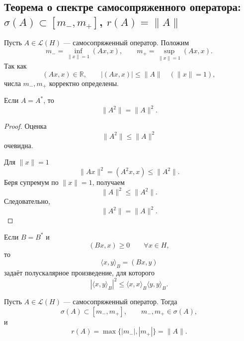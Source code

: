 \subsection{Теорема о спектре самосопряженного оператора:
	\texorpdfstring{\(\sigma(A)\subset[m_-,m_+]\), \(r(A)=\|A\|\)}
	{sigma(A) subset [m-,m+], r(A)=||A||}}

\begin{definition}
	Пусть \(A\in\mathcal L(H)\) --- самосопряженный оператор. Положим
	\[
	m_-=\inf_{\|x\|=1}(Ax,x),
	\qquad
	m_+=\sup_{\|x\|=1}(Ax,x).
	\]
	Так как
	\[
	(Ax,x)\in\mathbb R,
	\qquad
	|(Ax,x)|\leqslant\|A\|
	\quad (\|x\|=1),
	\]
	числа \(m_-,m_+\) корректно определены.
\end{definition}

\begin{lemma}
	Если \(A=A^*\), то
	\[
	\|A^2\|=\|A\|^2.
	\]
\end{lemma}

\begin{proof}
	Оценка
	\[
	\|A^2\|\leqslant\|A\|^2
	\]
	очевидна.
	
	Для \(\|x\|=1\)
	\[
	\|Ax\|^2
	=
	(A^2x,x)
	\leqslant
	\|A^2\|.
	\]
	Беря супремум по \(\|x\|=1\), получаем
	\[
	\|A\|^2\leqslant\|A^2\|.
	\]
	Следовательно,
	\[
	\|A^2\|=\|A\|^2.
	\]
\end{proof}

\begin{remark}
	Если \(B=B^*\) и
	\[
	(Bx,x)\geqslant0
	\qquad
	\forall x\in H,
	\]
	то
	\[
	\langle x,y\rangle_B=(Bx,y)
	\]
	задаёт полускалярное произведение, для которого
	\[
	|\langle x,y\rangle_B|^2
	\leqslant
	\langle x,x\rangle_B
	\langle y,y\rangle_B.
	\]
\end{remark}

\begin{theorem}
	Пусть \(A\in\mathcal L(H)\) --- самосопряженный оператор. Тогда
	\[
	\sigma(A)\subset[m_-,m_+],
	\qquad
	m_-,m_+\in\sigma(A),
	\]
	и
	\[
	r(A)=\max\{|m_-|,|m_+|\}=\|A\|.
	\]
\end{theorem}

